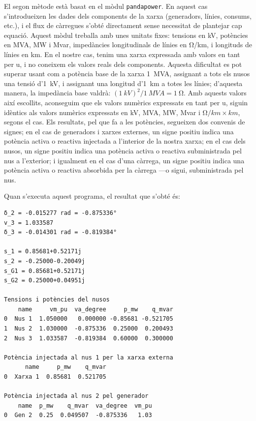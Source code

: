 El segon mètode està basat en el mòdul \texttt{pandapower}. En aquest cas s'introdueixen les dades dels components de la xarxa (generadors, línies, consums, etc.), i el flux de càrregues s'obté directament sense necessitat de plantejar cap equació. Aquest mòdul treballa amb unes unitats fixes: tensions en  \unit{kV}, potències en  \unit{MVA}, \unit{MW} i \unit{Mvar}, impedàncies longitudinals de línies en \unit{\ohm/km}, i longituds de línies en  \unit{km}. En el nostre cas, tenim una xarxa expressada amb valors en tant per u, i no coneixem els valors reals dels components. Aquesta dificultat es pot superar usant com a potència base de la xarxa \qty{1}{MVA}, assignant a tots els nusos una tensió d'\qty{1}{kV}, i assignant una longitud d'\qty{1}{km} a totes les línies; d'aquesta manera, la impedància base valdrà: $(\qty{1}{kV})^2/\qty{1}{MVA} = \qty{1}{\ohm}$. Amb aquests valors així escollits, aconseguim que els valors numèrics expressats en tant per u, siguin idèntics als valors numèrics expressats en 
\unit{kV},  \unit{MVA}, \unit{MW}, \unit{Mvar} i $\unit{\ohm/km}\times\unit{km}$, segons el cas. Els resultats, pel que fa a les potències,  segueixen dos convenis de signes; en el cas de generadors i xarxes externes, un signe positiu indica una potència activa o reactiva injectada a l'interior de la nostra xarxa; en el cas dels nusos, un signe positiu indica una potència activa o reactiva subministrada pel nus a l'exterior; i igualment en el cas d'una càrrega, un signe positiu indica una potència activa o reactiva absorbida per la càrrega ---o sigui, subministrada  pel nus.


Quan s'executa aquest programa, el resultat que s'obté és:
\lstset{
	language=,
	numbers=none,
	frame=none
}
\begin{lstlisting}
δ_2 = -0.015277 rad = -0.875336°
v_3 = 1.033587
δ_3 = -0.014301 rad = -0.819384°

s_1 = 0.85681+0.52171j
s_2 = -0.25000-0.20049j
s_G1 = 0.85681+0.52171j
s_G2 = 0.25000+0.04951j

Tensions i potències del nusos
    name     vm_pu  va_degree     p_mw    q_mvar
0  Nus 1  1.050000   0.000000 -0.85681 -0.521705
1  Nus 2  1.030000  -0.875336  0.25000  0.200493
2  Nus 3  1.033587  -0.819384  0.60000  0.300000

Potència injectada al nus 1 per la xarxa externa
      name     p_mw    q_mvar
0  Xarxa 1  0.85681  0.521705

Potència injectada al nus 2 pel generador
    name  p_mw    q_mvar  va_degree  vm_pu
0  Gen 2  0.25  0.049507  -0.875336   1.03
\end{lstlisting} 


